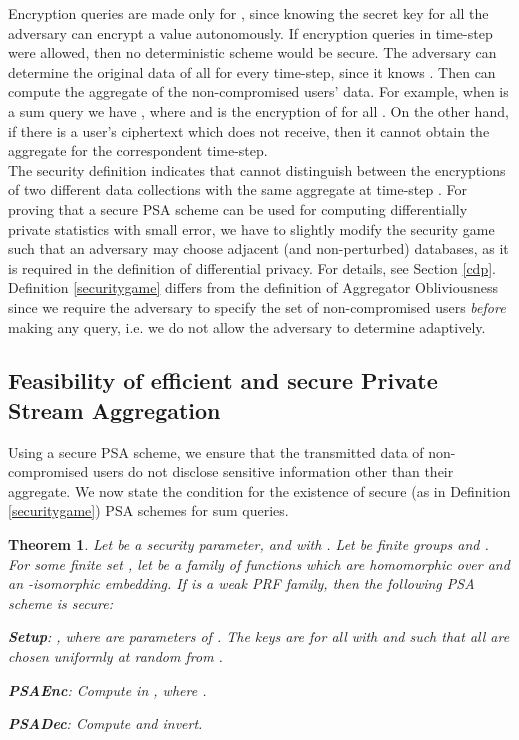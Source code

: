 \documentclass[10pt]{extarticle}
\newtheorem{Thm}{Theorem}
\begin{document}
Encryption queries are made only for , since knowing the secret key for all  the adversary can encrypt a value autonomously. If encryption queries in time-step  were allowed, then no deterministic scheme would be secure. The adversary  can determine the original data of all  for every time-step, since it knows . Then  can compute the aggregate of the non-compromised users' data. For example, when  is a sum query we have 
,
where  and  is the encryption of  for all . On the other hand, if there is a user's ciphertext which  does not receive, then it cannot obtain the aggregate for the correspondent time-step.\\ 
The security definition indicates that  cannot distinguish between the encryptions of two different data collections  with the same aggregate at time-step . For proving that a secure PSA scheme can be used for computing differentially private statistics with small error, we have to slightly modify the security game such that an adversary may choose adjacent (and non-perturbed) databases, as it is required in the definition of differential privacy. For details, see Section \ref{cdp}.\\
Definition \ref{securitygame} differs from the definition of Aggregator Obliviousness \cite{2} since we require the adversary to specify the set  of non-compromised users \textit{before} making any query, i.e. we do not allow the adversary to determine  adaptively.


\subsection{Feasibility of efficient and secure Private Stream Aggregation}

Using a secure PSA scheme, we ensure that the transmitted data of non-compromised users do not disclose sensitive information other than their aggregate. 
We now state the condition for the existence of secure (as in Definition \ref{securitygame}) PSA schemes for sum queries.

\begin{Thm}\label{PSATHEOREM}
Let  be a security parameter, and  with . Let  be finite groups and . For some finite set , let  be a family of functions which are homomorphic over  and  an -isomorphic embedding. If  is a weak PRF family, then the following PSA scheme  is secure:
\begin{description}
\item \textbf{\mbox{\upshape \sffamily Setup}}: , where  are parameters of . The keys are  for all  with  and  such that all  are chosen uniformly at random from .
\item \textbf{\mbox{\upshape \sffamily PSAEnc}}: Compute  in , where .
\item \textbf{\mbox{\upshape \sffamily PSADec}}: Compute  and invert.
\end{description}
\end{Thm}
\end{document}
